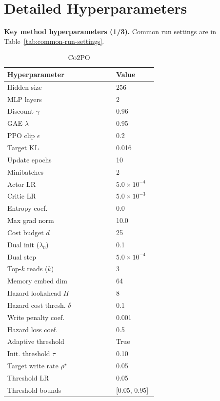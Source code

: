 \documentclass{article}
\theoremstyle{plain}
\theoremstyle{definition}
\theoremstyle{remark}
\begin{document}
\section{Detailed Hyperparameters}
\label{app:hparams}

\vfill
\begin{table}[h!]
\caption{\textbf{Key method hyperparameters (1/3).} Common run settings are in Table~\ref{tab:common-run-settings}.}
\label{tab:hparams-page1}
\centering
\begin{subtable}[t]{0.48\textwidth}
\caption{\textsc{Co2PO}}
\label{tab:hparams-co2po}
\centering
\scriptsize
\setlength{\tabcolsep}{4pt}
\renewcommand{\arraystretch}{1.08}
\begin{tabular}{@{}p{0.68\linewidth}p{0.26\linewidth}@{}}
\toprule
\textbf{Hyperparameter} & \textbf{Value} \\
\midrule
Hidden size & 256 \\
MLP layers & 2 \\
Discount $\gamma$ & 0.96 \\
GAE $\lambda$ & 0.95 \\
PPO clip $\epsilon$ & 0.2 \\
Target KL & 0.016 \\
Update epochs & 10 \\
Minibatches & 2 \\
Actor LR & $5.0\times 10^{-4}$ \\
Critic LR & $5.0\times 10^{-3}$ \\
Entropy coef. & 0.0 \\
Max grad norm & 10.0 \\
\midrule
Cost budget $d$ & 25 \\
Dual init ($\lambda_0$) & 0.1 \\
Dual step & $5.0\times 10^{-4}$ \\
\midrule
Top-$k$ reads ($k$) & 3 \\
Memory embed dim & 64 \\
Hazard lookahead $H$ & 8 \\
Hazard cost thresh. $\delta$ & 0.1 \\
Write penalty coef. & 0.001 \\
Hazard loss coef. & 0.5 \\
Adaptive threshold & True \\
Init. threshold $\tau$ & 0.10 \\
Target write rate $\rho^\star$ & 0.05 \\
Threshold LR & 0.05 \\
Threshold bounds & [0.05, 0.95] \\

\end{tabular}
\end{subtable}
\end{table}
\end{document}
